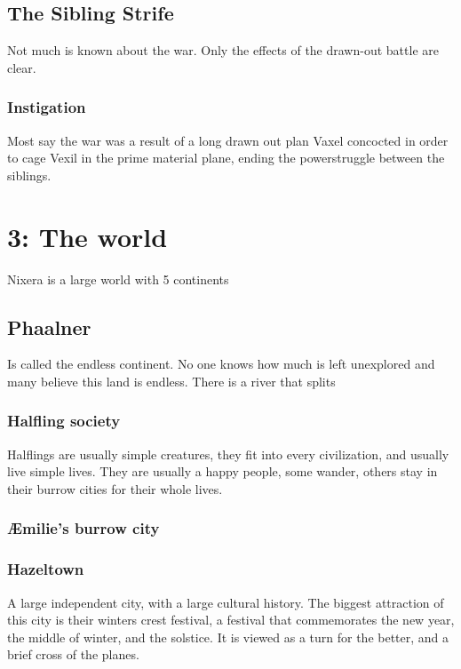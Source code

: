 \documentclass[a4paper]{article}
\begin{document}
\subsection{The Sibling Strife}
Not much is known about the war. Only the effects of the drawn-out battle are clear. 
 
\subsubsection{Instigation}
Most say the war was a result of a long drawn out plan Vaxel concocted in order to cage Vexil in the prime material plane, ending the powerstruggle between the siblings.

\section{3: The world}
Nixera is a large world with 5 continents
\subsection{Phaalner}
Is called the endless continent. No one knows how much is left unexplored and many believe this land is endless. There is a river that splits 

\subsubsection{Halfling society}
Halflings are usually simple creatures, they fit into every civilization, and usually live simple lives. They are usually a happy people, some wander, others stay in their burrow cities for their whole lives. 

\subsubsection{Æmilie's burrow city}

\subsubsection{Hazeltown}
A large independent city, with a large cultural history. The biggest attraction of this city is their winters crest festival, a festival that commemorates the new year, the middle of winter, and the solstice. It is viewed as a turn for the better, and a brief cross of the planes.
\end{document}
